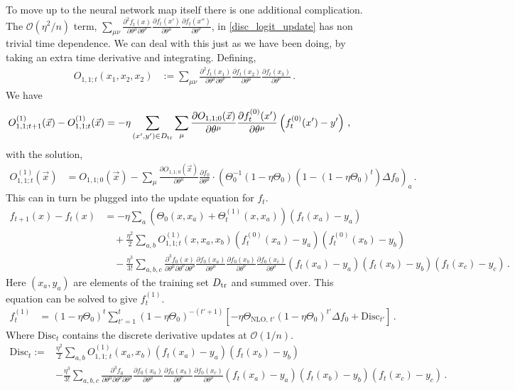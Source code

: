 \documentclass[english]{article}
\newcommand{\es}[2] {\begin{align} \label{#1} #2 \end{align}}
\begin{document}
To move up to the neural network map itself there is one additional complication. The $\mathcal{O}(\eta^{2}/n)$ term, $\sum_{\mu\nu}\frac{\partial^{2}f_t(x)}{\partial\theta^{\mu}\partial\theta^{\nu}}\frac{\partial f_{t}(x')}{\partial\theta^{\mu}}\frac{\partial f_{t}(x'')}{\partial\theta^{\nu}}$, in \eqref{disc_logit_update} has non trivial time dependence. We can deal with this just as we have been doing, by taking an extra time derivative and integrating. 
Defining,
\es{o1tildedef}{
O_{1,1;t}(x_1,x_2,x_2)&:=\sum_{\mu\nu}\frac{\partial^{2}f_t(x_1)}{\partial\theta^{\mu}\partial\theta^{\nu}}\frac{\partial f_{t}(x_2)}{\partial\theta^{\mu}}\frac{\partial f_{t}(x_3)}{\partial\theta^{\nu}}\,.
}
We have 
\es{o1tdepdiff}{
O_{1,1;t+1}^{(1)}(\vec{x})-O_{1,1;t}^{(1)}(\vec{x})&=-\eta\sum_{(x',y')\in D_{\rm tr}}\sum_{\mu}\frac{\partial O_{1,1;0}(\vec{x})}{\partial\theta^{\mu}}\frac{\partial f^{(0)}_{t}(x')}{\partial\theta^{\mu}}\left(f_{t}^{(0)}(x')-y'\right)\,,
}
with the solution,
\es{o1tdepsol}{
O_{1,1;t}^{(1)}(\vec{x})&=O_{1,1;0}(\vec{x})-\sum_{\mu}\frac{\partial O_{1,1;0}(\vec{x})}{\partial\theta^{\mu}}\frac{\partial f_{0}}{\partial\theta^{\mu}}\cdot\left(\Theta_{0}^{-1}(1-\eta\Theta_{0})(1-(1-\eta\Theta_{0})^{t})\Delta f_{0}\right)_{a}\,.
}
This can in turn be plugged into the update equation for $f_{t}$.
\begin{align}
f_{t+1}(x)-f_{t}(x) &=-\eta\sum_a \left(\Theta_{0}(x,x_a)+\Theta_{t}^{(1)}(x,x_a)\right)\left(f_{t}(x_a)-y_a\right)\nonumber\\
&\quad +\frac{\eta^{2}}{2}\sum_{a,b}O_{1,1;t}^{(1)}(x,x_a,x_b)\left(f_{t}^{(0)}(x_a)-y_a\right)\left(f_{t}^{(0)}(x_b)-y_b\right)\nonumber\\
&\quad-\frac{\eta^{3}}{3!}\sum_{a,b,c}\frac{\partial^{3}f_{0}(x)}{\partial\theta^{\mu}\partial\theta^{\nu}\partial\theta^{\rho}}\frac{\partial f_{0}(x_{a})}{\partial\theta^{\mu}}\frac{\partial f_{0}(x_{b})}{\partial\theta^{\nu}}\frac{\partial f_{0}(x_{c})}{\partial\theta^{\rho}}\left(f_{t}(x_a)-y_a\right)\left(f_{t}(x_b)-y_b\right)\left(f_{t}(x_c)-y_c\right)\,.\label{disc_f_update_partial}
\end{align}
Here $(x_{a},y_{a})$ are elements of the training set $D_{\rm tr}$ and summed over. This equation can be solved to give $f_{t}^{(1)}$.
\es{disc_f_update_nlo}{
f_{t}^{(1)}&=(1-\eta\Theta_{0})^{t}\sum_{t'=1}^{t}(1-\eta\Theta_{0})^{-(t'+1)}\left[-\eta\Theta_{\textrm{NLO},\,t'}(1-\eta\Theta_{0})^{t'}\Delta f_{0}+\textrm{Disc}_{t'}\right]\,.
}
Where $\textrm{Disc}_{t}$ contains the discrete derivative updates at $\mathcal{O}(1/n)$.
\begin{align}
\textrm{Disc}_{t}:=&\frac{\eta^{2}}{2}\sum_{a,b}O^{(1)}_{1,1;\,t}(x_{a},x_{b})\left(f_{t}(x_a)-y_a\right)\left(f_{t}(x_b)-y_b\right)\nonumber\\
&-\frac{\eta^{3}}{3!}\sum_{a,b,c}\frac{\partial^{3}f_{0}}{\partial\theta^{\mu}\partial\theta^{\nu}\partial\theta^{\rho}}\frac{\partial f_{0}(x_{a})}{\partial\theta^{\mu}}\frac{\partial f_{0}(x_{b})}{\partial\theta^{\nu}}\frac{\partial f_{0}(x_{c})}{\partial\theta^{\rho}}\left(f_{t}(x_a)-y_a\right)\left(f_{t}(x_b)-y_b\right)\left(f_{t}(x_c)-y_c\right)\,.\label{Discdef}
\end{align}
\end{document}
